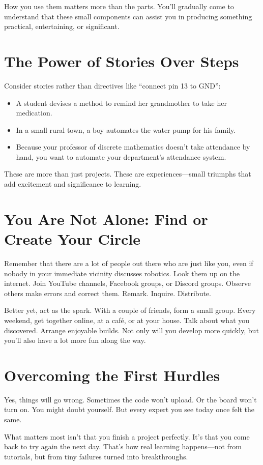 \documentclass[a4paper,10pt,twocolumn]{memoir}
\begin{document}
How you use them matters more than the parts. You’ll gradually come to understand that these small components can assist you in producing something practical, entertaining, or significant.
\section*{The Power of Stories Over Steps}
Consider stories rather than directives like ``connect pin 13 to GND'':
\begin{itemize}
    \item A student devises a method to remind her grandmother to take her medication.
    \item In a small rural town, a boy automates the water pump for his family.
    \item Because your professor of discrete mathematics doesn’t take attendance by hand, you want to automate your department’s attendance system.
\end{itemize}
These are more than just projects. These are experiences—small triumphs that add excitement and significance to learning.
\section*{You Are Not Alone: Find or Create Your Circle}
Remember that there are a lot of people out there who are just like you, even if nobody in your immediate vicinity discusses robotics. Look them up on the internet. Join YouTube channels, Facebook groups, or Discord groups. Observe others make errors and correct them. Remark. Inquire. Distribute.

Better yet, act as the spark. With a couple of friends, form a small group. Every weekend, get together online, at a café, or at your house. Talk about what you discovered. Arrange enjoyable builds. Not only will you develop more quickly, but you’ll also have a lot more fun along the way.
\section*{Overcoming the First Hurdles}
Yes, things will go wrong. Sometimes the code won’t upload. Or the board won’t turn on. You might doubt yourself. But every expert you see today once felt the same.

What matters most isn’t that you finish a project perfectly. It’s that you come back to try again the next day. That’s how real learning happens—not from tutorials, but from tiny failures turned into breakthroughs.
\end{document}
